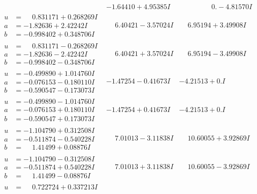 \documentclass[1p]{elsarticle_modified}
\theoremstyle{definition}
\begin{document}
$$\begin{array}{c|c|c}
 & -1.64410 + 4.95385 I & \phantom{-0.000000 } 0. - 4.81570 I \\ \hline\begin{aligned}
u &= \phantom{-}0.831171 + 0.268269 I \\
a &= -1.82636 + 2.42242 I \\
b &= -0.998402 + 0.348706 I\end{aligned}
 & \phantom{-}6.40421 - 3.57024 I & \phantom{-}6.95194 + 3.49908 I \\ \hline\begin{aligned}
u &= \phantom{-}0.831171 - 0.268269 I \\
a &= -1.82636 - 2.42242 I \\
b &= -0.998402 - 0.348706 I\end{aligned}
 & \phantom{-}6.40421 + 3.57024 I & \phantom{-}6.95194 - 3.49908 I \\ \hline\begin{aligned}
u &= -0.499890 + 1.014760 I \\
a &= -0.076153 - 0.180110 I \\
b &= -0.590547 - 0.173073 I\end{aligned}
 & -1.47254 - 0.41673 I & -4.21513 + 0. I\phantom{ +0.000000I} \\ \hline\begin{aligned}
u &= -0.499890 - 1.014760 I \\
a &= -0.076153 + 0.180110 I \\
b &= -0.590547 + 0.173073 I\end{aligned}
 & -1.47254 + 0.41673 I & -4.21513 + 0. I\phantom{ +0.000000I} \\ \hline\begin{aligned}
u &= -1.104790 + 0.312508 I \\
a &= -0.511874 - 0.540228 I \\
b &= \phantom{-}1.41499 + 0.08876 I\end{aligned}
 & \phantom{-}7.01013 - 3.11838 I & \phantom{-}10.60055 + 3.92869 I \\ \hline\begin{aligned}
u &= -1.104790 - 0.312508 I \\
a &= -0.511874 + 0.540228 I \\
b &= \phantom{-}1.41499 - 0.08876 I\end{aligned}
 & \phantom{-}7.01013 + 3.11838 I & \phantom{-}10.60055 - 3.92869 I \\ \hline\begin{aligned}
u &= \phantom{-}0.722724 + 0.337213 I \\

\end{aligned}
\end{array}$$
\end{document}
